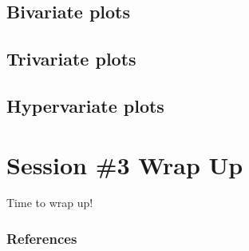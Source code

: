 \documentclass[aspectratio=1610]{beamer}
\begin{document}
\subsection{Bivariate plots}


\subsection{Trivariate plots}


\subsection{Hypervariate plots}



\section{Session \#3 Wrap Up}

\begin{frame}{}{}
	\LARGE \centering Time to wrap up!
\end{frame}

\begin{frame}
	\frametitle{References}
	\printbibliography
\end{frame}
\end{document}
